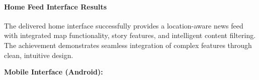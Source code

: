 \paragraph{Home Feed Interface Results}
The delivered home interface successfully provides a location-aware news feed with integrated map functionality, story features, and intelligent content filtering. The achievement demonstrates seamless integration of complex features through clean, intuitive design.

\textbf{Mobile Interface (Android):}
\begin{figure}[!htbp]
    \centering
    \hspace{0.05\textwidth}
\end{figure}
